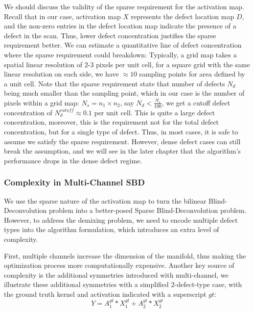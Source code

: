 We should discuss the validity of the sparse requirement for the activation map. Recall that in our case, activation map $X$ represents the defect location map $D$, and the non-zero entries in the defect location map indicate the presence of a defect in the scan. Thus, lower defect concentration justifies the sparse requirement better. We can estimate a quantitative line of defect concentration where the sparse requirement could breakdown: Typically, a grid map takes a spatial linear resolution of 2-3 pixels per unit cell, for a square grid with the same linear resolution on each side, we have $\approx 10$ sampling points for area defined by a unit cell. Note that the sparse requirement state that number of defects $N_d$ being much smaller than the sampling point, which in our case is the number of pixels within a grid map: $N_s = n_1 \times n_2$, say $N_d < \frac{N_s}{100}$, we get a cutoff defect concentration of $N_d^{cutoff} \approx 0.1$ per unit cell. This is quite a large defect concentration, moreover, this is the requirement not for the total defect concentration, but for a single type of defect. Thus, in most cases, it is safe to assume we satisfy the sparse requirement. However, dense defect cases can still break the assumption, and we will see in the later chapter that the algorithm's performance drops in the dense defect regime. 

\subsubsection{Complexity in Multi-Channel SBD}
We use the sparse nature of the activation map to turn the bilinear Blind-Deconvolution problem into a better-posed Sparse Blind-Deconvolution problem. However, to address the demixing problem, we need to encode multiple defect types into the algorithm formulation, which introduces an extra level of complexity. 

First, multiple channels increase the dimension of the manifold, thus making the optimization process more computationally expensive. Another key source of complexity is the additional symmetries introduced with multi-channel, we illustrate these additional symmetries with a simplified 2-defect-type case, with the ground truth kernel and activation indicated with a superscript $gt$: 
\begin{equation*}
	Y = A_1^{gt}*X_1^{gt} + A_2^{gt}*X_2^{gt}
\end{equation*} 

